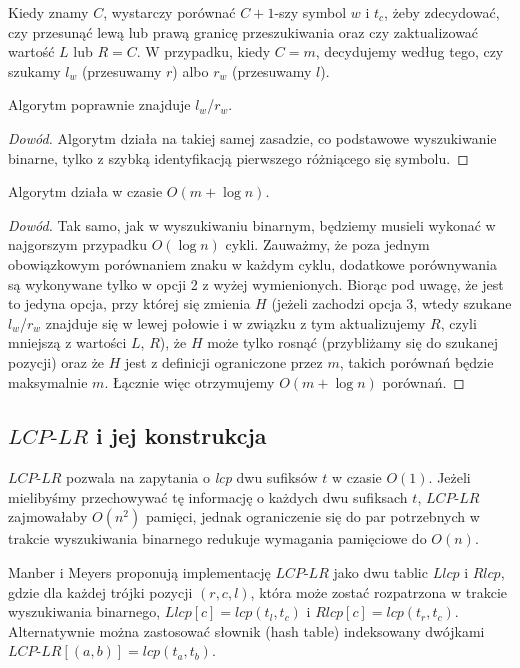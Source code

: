 Kiedy znamy $C$, wystarczy porównać $C+1$-szy symbol $w$ i $t_c$, żeby zdecydować, czy przesunąć lewą lub prawą granicę przeszukiwania oraz czy zaktualizować wartość $L$ lub $R = C$. W przypadku, kiedy $C = m$, decydujemy według tego, czy szukamy $l_w$ (przesuwamy $r$) albo $r_w$ (przesuwamy $l$).

\begin{theorem}{}{}
Algorytm poprawnie znajduje $l_w$/$r_w$.
\end{theorem}

\begin{proof}[Dowód]
Algorytm działa na takiej samej zasadzie, co podstawowe wyszukiwanie binarne, tylko z szybką identyfikacją pierwszego różniącego się symbolu.
\end{proof}

\begin{theorem}{}{}
Algorytm działa w czasie $O(m + \log{n})$.
\end{theorem}

\begin{proof}[Dowód]
Tak samo, jak w wyszukiwaniu binarnym, będziemy musieli wykonać w najgorszym przypadku $O(\log{n})$ cykli. Zauważmy, że poza jednym obowiązkowym porównaniem znaku w każdym cyklu, dodatkowe porównywania są wykonywane tylko w opcji 2 z wyżej wymienionych. Biorąc pod uwagę, że jest to jedyna opcja, przy której się zmienia $H$ (jeżeli zachodzi opcja 3, wtedy szukane $l_w$/$r_w$ znajduje się w lewej połowie i w związku z tym aktualizujemy $R$, czyli mniejszą z wartości $L$, $R$), że $H$ może tylko rosnąć (przybliżamy się do szukanej pozycji) oraz że $H$ jest z definicji ograniczone przez $m$, takich porównań będzie maksymalnie $m$. Łącznie więc otrzymujemy $O(m + \log{n})$ porównań.
\end{proof}

\subsection*{$LCP\textrm{-}LR$ i jej konstrukcja}

$LCP\textrm{-}LR$ pozwala na zapytania o \textit{lcp} dwu sufiksów $t$ w czasie $O(1)$. Jeżeli mielibyśmy przechowywać tę informację o każdych dwu sufiksach $t$, $LCP\textrm{-}LR$ zajmowałaby $O(n^2)$ pamięci, jednak ograniczenie się do par potrzebnych w trakcie wyszukiwania binarnego redukuje wymagania pamięciowe do $O(n)$.

Manber i Meyers proponują implementację $LCP\textrm{-}LR$ jako dwu tablic $Llcp$ i $Rlcp$, gdzie dla każdej trójki pozycji $(r, c, l)$, która może zostać rozpatrzona w trakcie wyszukiwania binarnego, $Llcp[c] = lcp(t_l, t_c)$ i $Rlcp[c] = lcp(t_r, t_c)$. Alternatywnie można zastosować słownik (hash table) indeksowany dwójkami $LCP\textrm{-}LR[(a, b)] = lcp(t_a, t_b)$.

